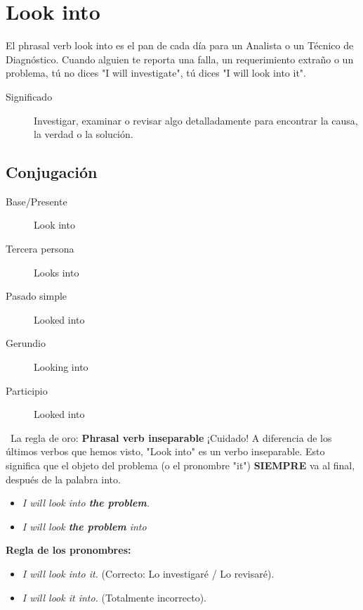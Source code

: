 \documentclass[
10pt, %
a4paper, %
oneside, %
headinclude,footinclude, %
BCOR5mm, %
]{scrartcl}
\begin{document}
\newpage

\section{Look into}

El phrasal verb look into es el pan de cada día para un Analista o un Técnico de Diagnóstico. Cuando alguien te reporta una falla, un requerimiento extraño o un problema, tú no dices "I will investigate", tú dices "I will look into it".

\begin{description}
	\item[Significado] Investigar, examinar o revisar algo detalladamente para encontrar la causa, la verdad o la solución.
\end{description}

\subsection{Conjugación}
\begin{description}
	\item[Base/Presente] Look into
	\item[Tercera persona] Looks into
	\item[Pasado simple] Looked into
	\item[Gerundio] Looking into
	\item[Participio] Looked into
\end{description}

\begin{InfoBox}{\textcolor{Goldenrod}{} \, La regla de oro: \textbf{Phrasal verb inseparable}} 
	¡Cuidado! A diferencia de los últimos verbos que hemos visto, "Look into" es un verbo inseparable. Esto significa que el objeto del problema (o el pronombre "it") \textbf{SIEMPRE} va al final, después de la palabra into.
	
	\begin{itemize}
		\item \textcolor{green}{} \textit{I will look into \textbf{the problem}. }
		\item \textcolor{red}{} \textit{I will look \textbf{the problem} into} 
	\end{itemize}
	
	\textbf{Regla de los pronombres:}
	
	\begin{itemize}
		\item \textcolor{green}{} \textit{I will look into it. } (Correcto: Lo investigaré / Lo revisaré).
		\item \textcolor{red}{} \textit{I will look it into.} (Totalmente incorrecto).
	\end{itemize}
\end{InfoBox}


%


\end{document}
